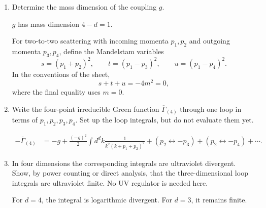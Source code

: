 \begin{enumerate}[label=\alph*)]
    \item Determine the mass dimension of the coupling $g$.
    \begin{solution}
        $g$ has mass dimension $4-d = 1$.
    \end{solution}

    For two-to-two scattering with incoming momenta $p_1,p_2$ and outgoing
    momenta $p_3,p_4$, define the Mandelstam variables
    \begin{equation}
        s=(p_1+p_2)^2,
        \qquad
        t=(p_1-p_3)^2,
        \qquad
        u=(p_1-p_4)^2.
    \end{equation}
    In the conventions of the sheet,
    \begin{equation}
        s+t+u=-4m^2=0,
    \end{equation}
    where the final equality uses $m=0$.

    \item Write the four-point irreducible Green function
    $\overline\Gamma_{(4)}$ through one loop in terms of
    $p_1,p_2,p_3,p_4$. Set up the loop integrals, but do not evaluate them yet.
    \begin{solution}
        \begin{equation}
            \begin{aligned}
                -\overline\Gamma_{(4)}
                &= -g + \frac{(-g)^2}{2}\int d^dk \frac{1}{k^2(k+p_1+p_2)^2} + (p_2 \leftrightarrow -p_3) + (p_2 \leftrightarrow -p_4) + \cdots.
            \end{aligned}
        \end{equation}
    \end{solution}

    \item In four dimensions the corresponding integrals are ultraviolet
    divergent. Show, by power counting or direct analysis, that the
    three-dimensional loop integrals are ultraviolet finite. No UV regulator
    is needed here.
    \begin{solution}
        For $d=4$, the integral is logarithmic divergent. For $d=3$, it remains finite.
    \end{solution}


\end{enumerate}
